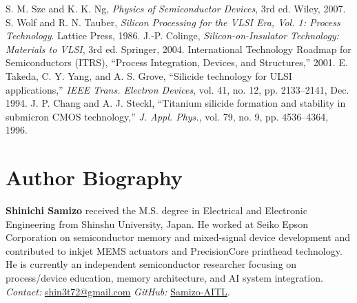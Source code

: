 \documentclass[conference]{IEEEtran}
\begin{document}
\begin{thebibliography}{99}
 S. M. Sze and K. K. Ng, \textit{Physics of Semiconductor Devices}, 3rd ed. Wiley, 2007.
 S. Wolf and R. N. Tauber, \textit{Silicon Processing for the VLSI Era, Vol. 1: Process Technology}. Lattice Press, 1986.
 J.-P. Colinge, \textit{Silicon-on-Insulator Technology: Materials to VLSI}, 3rd ed. Springer, 2004.
 International Technology Roadmap for Semiconductors (ITRS), ``Process Integration, Devices, and Structures,'' 2001.
 E. Takeda, C. Y. Yang, and A. S. Grove, ``Silicide technology for ULSI applications,'' \textit{IEEE Trans. Electron Devices}, vol. 41, no. 12, pp. 2133--2141, Dec. 1994.
 J. P. Chang and A. J. Steckl, ``Titanium silicide formation and stability in submicron CMOS technology,'' \textit{J. Appl. Phys.}, vol. 79, no. 9, pp. 4536--4364, 1996.
\end{thebibliography}

\section*{Author Biography}
\textbf{Shinichi Samizo} received the M.S. degree in Electrical and Electronic Engineering from Shinshu University, Japan.
He worked at Seiko Epson Corporation on semiconductor memory and mixed-signal device development and contributed to inkjet MEMS actuators and PrecisionCore printhead technology.
He is currently an independent semiconductor researcher focusing on process/device education, memory architecture, and AI system integration.\\
\emph{Contact:} \href{mailto:shin3t72@gmail.com}{shin3t72@gmail.com}\quad
\emph{GitHub:} \href{https://github.com/Samizo-AITL}{Samizo-AITL}.
\end{document}
